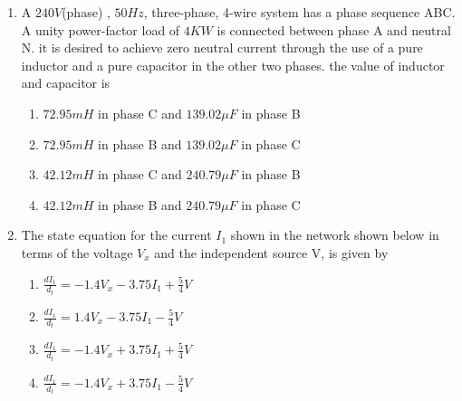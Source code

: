 \documentclass[journal,12pt,onecolumn]{IEEEtran}
\theoremstyle{remark}
\begin{document}
\begin{enumerate}
\item A $240 V$(phase) , $50 Hz$, three-phase, 4-wire system has a phase sequence ABC. A unity power-factor load of $4 KW$ is connected between phase A and neutral N. it is desired to achieve zero neutral current through the use of a pure inductor and a pure capacitor in the other two phases. the value of inductor and capacitor is 
\begin{enumerate}
    \item $72.95 mH$ in phase C and $139.02 \mu F$ in phase B
    \item $72.95 mH$ in phase B and $139.02 \mu F$ in phase C
    \item $42.12 mH$ in phase C and $240.79 \mu F$ in phase B
    \item $42.12 mH$ in phase B and $240.79 \mu F$ in phase C \\
\end{enumerate}

\item The state equation for the current $I_1$ shown in the network shown below in terms of the voltage $V_x$ and the independent source V, is given by \\



\begin{figure}[!ht]
\centering
{}%

\label{fig:my_label}
\end{figure}

\begin{enumerate}
    \item $\frac{dI_1}{d_t}=-1.4V_x-3.75I_1+\frac{5}{4}V$
    \item $\frac{dI_1}{d_t}=1.4V_x-3.75I_1-\frac{5}{4}V$
    \item $\frac{dI_1}{d_t}=-1.4V_x+3.75I_1+\frac{5}{4}V$
    \item $\frac{dI_1}{d_t}=-1.4V_x+3.75I_1-\frac{5}{4}V$
\end{enumerate}


\end{enumerate}
\end{document}
